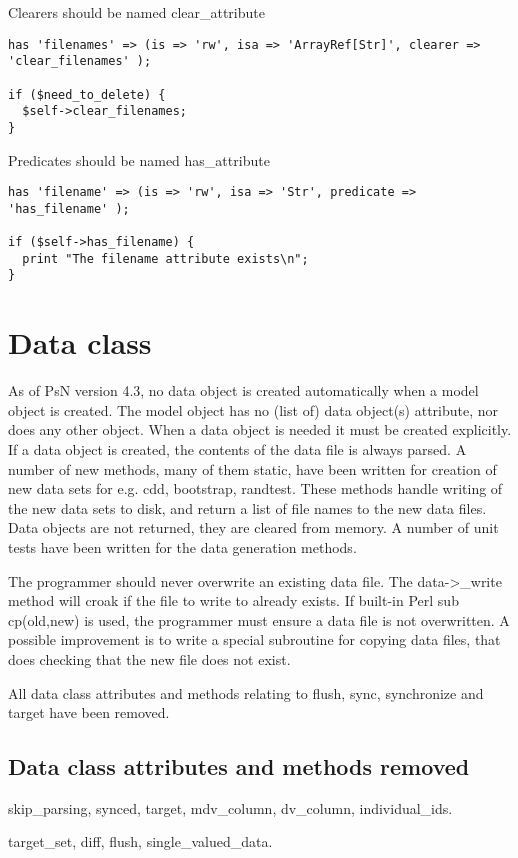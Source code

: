 Clearers should be named clear\_attribute
\begin{verbatim}
has 'filenames' => (is => 'rw', isa => 'ArrayRef[Str]', clearer => 'clear_filenames' );

if ($need_to_delete) {
  $self->clear_filenames;
}
\end{verbatim}

Predicates should be named has\_attribute
\begin{verbatim}
has 'filename' => (is => 'rw', isa => 'Str', predicate => 'has_filename' );

if ($self->has_filename) {
  print "The filename attribute exists\n";
}
\end{verbatim}


\section{Data class}
As of PsN version 4.3, no data object is created automatically when a model object is created.
The model object has no (list of) data object(s) attribute, nor does any other object.
When a data object is needed it must be created explicitly. If a data object is created, the contents of the
data file is always parsed. A number of new methods, many of them
static, have been written for creation of new data sets for e.g. cdd, bootstrap, randtest.
These methods handle writing of the new data sets to disk, and return a list of file names to the
new data files. Data objects are not returned, they are cleared from memory. A number of unit tests have been written for
the data generation methods.

The programmer should never overwrite
an existing data file.
The data->\_write method will croak if the file to write to already exists. If built-in Perl sub cp(old,new) is
used, the programmer must ensure a data file is not overwritten. A possible improvement is to write a special subroutine
for copying data files, that does checking that the new file does not exist.

All data class attributes and methods relating to flush, sync, synchronize and target have been removed.

\subsection{Data class attributes and methods removed}
skip\_parsing, synced, target, mdv\_column, dv\_column, individual\_ids.

target\_set, diff, flush, single\_valued\_data.

